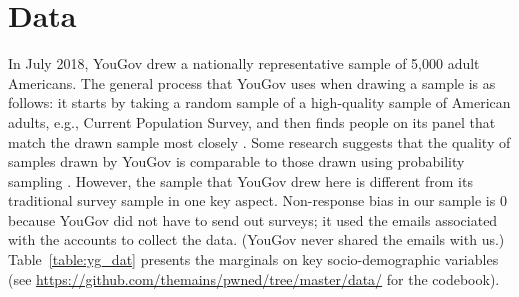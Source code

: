 \documentclass[12pt, letterpaper]{article}
\begin{document}
\section*{Data}
In July 2018, YouGov drew a nationally representative sample of 5,000 adult Americans. The general process that YouGov uses when drawing a sample is as follows: it starts by taking a random sample of a high-quality sample of American adults, e.g., Current Population Survey, and then finds people on its panel that match the drawn sample most closely \citep[for more details, see][]{rivers}. Some research suggests that the quality of samples drawn by YouGov is comparable to those drawn using probability sampling \citep{ansolabehere2014does}. However, the sample that YouGov drew here is different from its traditional survey sample in one key aspect. Non-response bias in our sample is 0 because YouGov did not have to send out surveys; it used the emails associated with the accounts to collect the data. (YouGov never shared the emails with us.) Table~\ref{table:yg_dat} presents the marginals on key socio-demographic variables (see \href{https://github.com/themains/pwned/tree/master/data/}{https://github.com/themains/pwned/tree/master/data/} for the codebook). 
\end{document}
